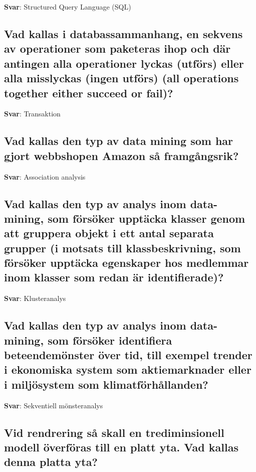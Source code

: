 \documentclass[a4paper,11pt,oneside]{article}
\begin{document}
\begin{sloppypar}
\label{q:54:sa:sv:True}

\textbf{Svar}: Structured Query Language (SQL)



\subsection{Vad kallas i databassammanhang, en sekvens av operationer som paketeras ihop och d\"ar antingen alla operationer lyckas (utf\"ors) eller alla misslyckas (ingen utf\"ors) (all operations together either succeed or fail)?}

\label{q:55:sa:sv:True}

\textbf{Svar}: Transaktion



\subsection{Vad kallas den typ av data mining som har gjort webbshopen Amazon s\r{a} framg\r{a}ngsrik?}

\label{q:56:sa:sv:True}

\textbf{Svar}: Association analysis



\subsection{Vad kallas den typ av analys inom data-mining, som f\"ors\"oker uppt\"acka klasser genom att gruppera objekt i ett antal separata grupper (i motsats till klassbeskrivning, som f\"ors\"oker uppt\"acka egenskaper hos medlemmar inom klasser som redan \"ar identifierade)?}

\label{q:57:sa:sv:True}

\textbf{Svar}: Klusteranalys



\subsection{Vad kallas den typ av analys inom data-mining, som f\"ors\"oker identifiera beteendem\"onster \"over tid, till exempel trender i ekonomiska system som aktiemarknader eller i milj\"osystem som klimatf\"orh\r{a}llanden?}

\label{q:58:sa:sv:True}

\textbf{Svar}: Sekventiell m\"onsteranalys



\subsection{Vid rendrering s\r{a} skall en trediminsionell modell \"overf\"oras till en platt yta. Vad kallas denna platta yta?}


\end{sloppypar}
\end{document}
